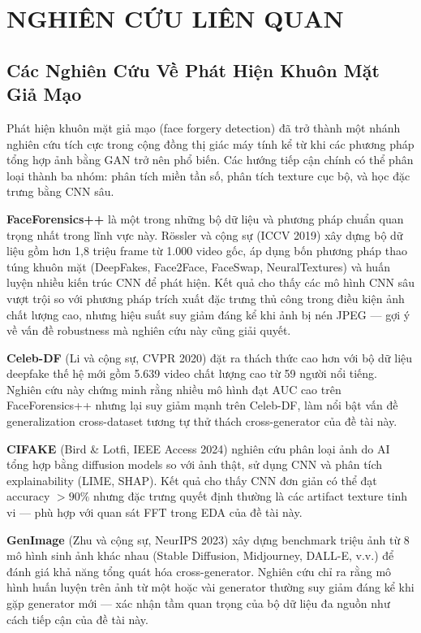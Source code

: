 \chapter{NGHIÊN CỨU LIÊN QUAN}

\section{Các Nghiên Cứu Về Phát Hiện Khuôn Mặt Giả Mạo}

Phát hiện khuôn mặt giả mạo (face forgery detection) đã trở thành một nhánh nghiên cứu tích cực trong cộng đồng thị giác máy tính kể từ khi các phương pháp tổng hợp ảnh bằng GAN trở nên phổ biến. Các hướng tiếp cận chính có thể phân loại thành ba nhóm: phân tích miền tần số, phân tích texture cục bộ, và học đặc trưng bằng CNN sâu.

\textbf{FaceForensics++} \cite{rossler2019faceforensics} là một trong những bộ dữ liệu và phương pháp chuẩn quan trọng nhất trong lĩnh vực này. Rössler và cộng sự (ICCV 2019) xây dựng bộ dữ liệu gồm hơn 1,8 triệu frame từ 1.000 video gốc, áp dụng bốn phương pháp thao túng khuôn mặt (DeepFakes, Face2Face, FaceSwap, NeuralTextures) và huấn luyện nhiều kiến trúc CNN để phát hiện. Kết quả cho thấy các mô hình CNN sâu vượt trội so với phương pháp trích xuất đặc trưng thủ công trong điều kiện ảnh chất lượng cao, nhưng hiệu suất suy giảm đáng kể khi ảnh bị nén JPEG --- gợi ý về vấn đề robustness mà nghiên cứu này cũng giải quyết.

\textbf{Celeb-DF} \cite{li2020celebdf} (Li và cộng sự, CVPR 2020) đặt ra thách thức cao hơn với bộ dữ liệu deepfake thế hệ mới gồm 5.639 video chất lượng cao từ 59 người nổi tiếng. Nghiên cứu này chứng minh rằng nhiều mô hình đạt AUC cao trên FaceForensics++ nhưng lại suy giảm mạnh trên Celeb-DF, làm nổi bật vấn đề generalization cross-dataset tương tự thử thách cross-generator của đề tài này.

\textbf{CIFAKE} \cite{bird2024cifake} (Bird \& Lotfi, IEEE Access 2024) nghiên cứu phân loại ảnh do AI tổng hợp bằng diffusion models so với ảnh thật, sử dụng CNN và phân tích explainability (LIME, SHAP). Kết quả cho thấy CNN đơn giản có thể đạt accuracy $> 90\%$ nhưng đặc trưng quyết định thường là các artifact texture tinh vi --- phù hợp với quan sát FFT trong EDA của đề tài này.

\textbf{GenImage} \cite{zhu2023genimage} (Zhu và cộng sự, NeurIPS 2023) xây dựng benchmark triệu ảnh từ 8 mô hình sinh ảnh khác nhau (Stable Diffusion, Midjourney, DALL-E, v.v.) để đánh giá khả năng tổng quát hóa cross-generator. Nghiên cứu chỉ ra rằng mô hình huấn luyện trên ảnh từ một hoặc vài generator thường suy giảm đáng kể khi gặp generator mới --- xác nhận tầm quan trọng của bộ dữ liệu đa nguồn như cách tiếp cận của đề tài này.

